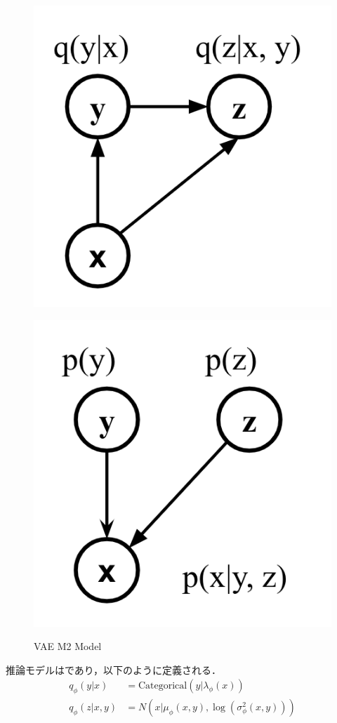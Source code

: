 \begin{figure}[H]
	\centering
	\begin{minipage}{0.4\columnwidth}
		\centering
		\includegraphics[clip, width=0.7\linewidth]{fig/chapter2/discriminative_vae}
		\label{fig:m2_discriminative}
	\end{minipage}
	\begin{minipage}{0.4\columnwidth}
		\centering
		\includegraphics[clip, width=0.7\linewidth]{fig/chapter2/generative_vae}
		\label{fig:m2_generative}
	\end{minipage}
	\caption{VAE M2 Model}
	\label{fig:vae_m2}
\end{figure}

推論モデルはであり，以下のように定義される．
\begin{align}\label{eq:m2_discriminative}
q_\phi (y | x) & = \mathrm{Categorical}(y | \lambda_\phi (x)) \\
q_\phi (z | x, y) & = N(x | \mu_\phi(x, y), \log(\sigma_\phi^2 (x, y)))
\end{align}

